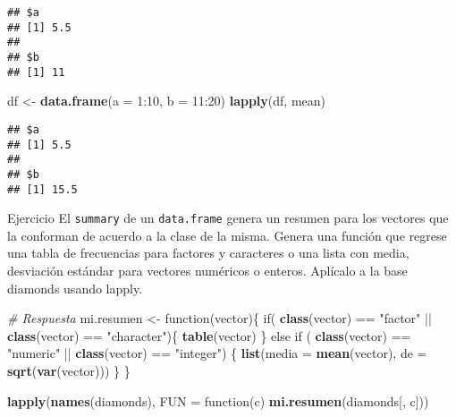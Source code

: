 \documentclass[]{article}
\newenvironment{Shaded}{\begin{snugshade}}{\end{snugshade}}
\newcommand{\KeywordTok}[1]{\textcolor[rgb]{0.13,0.29,0.53}{\textbf{{#1}}}}
\newcommand{\DataTypeTok}[1]{\textcolor[rgb]{0.13,0.29,0.53}{{#1}}}
\newcommand{\DecValTok}[1]{\textcolor[rgb]{0.00,0.00,0.81}{{#1}}}
\newcommand{\StringTok}[1]{\textcolor[rgb]{0.31,0.60,0.02}{{#1}}}
\newcommand{\CommentTok}[1]{\textcolor[rgb]{0.56,0.35,0.01}{\textit{{#1}}}}
\newcommand{\NormalTok}[1]{{#1}}
\begin{document}
\begin{verbatim}
## $a
## [1] 5.5
## 
## $b
## [1] 11
\end{verbatim}

\begin{Shaded}
\begin{Highlighting}[]
\NormalTok{df <-}\StringTok{ }\KeywordTok{data.frame}\NormalTok{(}\DataTypeTok{a =} \DecValTok{1}\NormalTok{:}\DecValTok{10}\NormalTok{, }\DataTypeTok{b =} \DecValTok{11}\NormalTok{:}\DecValTok{20}\NormalTok{)}
\KeywordTok{lapply}\NormalTok{(df, mean)}
\end{Highlighting}
\end{Shaded}

\begin{verbatim}
## $a
## [1] 5.5
## 
## $b
## [1] 15.5
\end{verbatim}

\renewcommand\bcStyleTitre[1]{\large\textcolor{bbblack}{#1}}

\begin{bclogo}[
  couleur=llred,
  arrondi=0,
  logo=\bcstop,
  barre=none,
  noborder=true]{Ejercicio}
El \texttt{summary} de un \texttt{data.frame} genera un resumen para los vectores que la 
conforman de acuerdo a la clase de la misma. Genera una función que regrese
una tabla de frecuencias para factores y caracteres o una lista con media, 
desviación estándar para vectores numéricos o enteros. Aplícalo a la base diamonds
usando lapply.

\end{bclogo}

\begin{Shaded}
\begin{Highlighting}[]
\CommentTok{# Respuesta}
\NormalTok{mi.resumen <-}\StringTok{ }\NormalTok{function(vector)\{}
  \NormalTok{if( }\KeywordTok{class}\NormalTok{(vector) ==}\StringTok{ "factor"} \NormalTok{||}\StringTok{ }\KeywordTok{class}\NormalTok{(vector) ==}\StringTok{ "character"}\NormalTok{)\{}
    \KeywordTok{table}\NormalTok{(vector)}
  \NormalTok{\} else if ( }\KeywordTok{class}\NormalTok{(vector) ==}\StringTok{ "numeric"} \NormalTok{||}\StringTok{ }\KeywordTok{class}\NormalTok{(vector) ==}\StringTok{ "integer"}\NormalTok{) \{}
    \KeywordTok{list}\NormalTok{(}\DataTypeTok{media =} \KeywordTok{mean}\NormalTok{(vector), }\DataTypeTok{de =} \KeywordTok{sqrt}\NormalTok{(}\KeywordTok{var}\NormalTok{(vector)))}
  \NormalTok{\}}
\NormalTok{\}}

\KeywordTok{lapply}\NormalTok{(}\KeywordTok{names}\NormalTok{(diamonds), }\DataTypeTok{FUN =} \NormalTok{function(c) }\KeywordTok{mi.resumen}\NormalTok{(diamonds[, c]))}
\end{Highlighting}
\end{Shaded}
\end{document}

